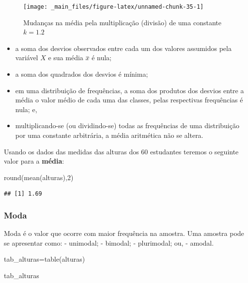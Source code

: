 \documentclass[
]{book}
\newenvironment{Shaded}{\begin{snugshade}}{\end{snugshade}}
\newcommand{\DecValTok}[1]{\textcolor[rgb]{0.00,0.00,0.81}{#1}}
\newcommand{\FunctionTok}[1]{\textcolor[rgb]{0.00,0.00,0.00}{#1}}
\newcommand{\NormalTok}[1]{#1}
\newcommand{\OtherTok}[1]{\textcolor[rgb]{0.56,0.35,0.01}{#1}}
\providecommand{\tightlist}{%
  \setlength{\itemsep}{0pt}\setlength{\parskip}{0pt}}
\begin{document}
\begin{figure}

{\centering \texttt{[image: \_main\_files/figure-latex/unnamed-chunk-35-1]} 

}

\caption{Mudanças na média pela multiplicação (divisão) de uma constante $k=1.2$}\label{fig:unnamed-chunk-35}
\end{figure}

\begin{itemize}
\tightlist
\item
  a soma dos desvios observados entre cada um dos valores assumidos pela variável \(X\) e sua média \(\stackrel{-}{x}\) é nula;
\item
  a soma dos quadrados dos desvios é mínima;
\item
  em uma distribuição de frequências, a soma dos produtos dos desvios entre a média o valor médio de cada uma das classes, pelas respectivas frequências é nula; e,
\item
  multiplicando-se (ou dividindo-se) todas as frequências de uma distribuição por uma constante arbitrária, a média aritmética não se altera.
\end{itemize}

Usando os dados das medidas das alturas dos 60 estudantes teremos o seguinte valor para a \textbf{média}:

\begin{Shaded}
\begin{Highlighting}[]
\FunctionTok{round}\NormalTok{(}\FunctionTok{mean}\NormalTok{(alturas),}\DecValTok{2}\NormalTok{)}
\end{Highlighting}
\end{Shaded}

\begin{verbatim}
## [1] 1.69
\end{verbatim}

\hypertarget{moda}{%
\subsubsection{Moda}\label{moda}}

Moda é o valor que ocorre com maior frequência na amostra. Uma amostra pode se apresentar como:
- unimodal;
- bimodal;
- plurimodal; ou,
- amodal.

\begin{Shaded}
\begin{Highlighting}[]
\NormalTok{tab\_alturas}\OtherTok{=}\FunctionTok{table}\NormalTok{(alturas)}

\NormalTok{tab\_alturas}
\end{Highlighting}
\end{Shaded}
\end{document}
